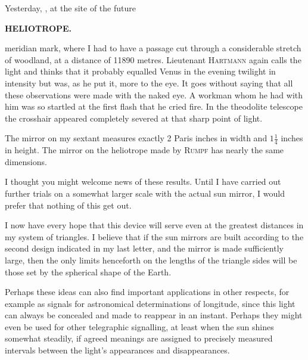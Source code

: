\par\noindent\hspace*{\parindent}Yesterday, , at the site of the future 

\par\clearpage
\noindent\null\hfill{\small\textbf{HELIOTROPE.}}\hfill{}\par\medskip
\noindent{} meridian mark, where I had to have a passage cut through a considerable stretch of woodland, at a distance of 11890 metres. Lieutenant \textsc{Hartmann} again calls the light  and thinks that it probably equalled Venus in the evening twilight in intensity but was, as he put it, more  to the eye. It goes without saying that all these observations were made with the naked eye. A workman whom he had with him was so startled at the first flash that he cried fire. In the theodolite telescope the crosshair appeared completely severed at that sharp point of light.

\par\noindent\hspace*{\parindent}The mirror on my sextant measures exactly 2 Paris inches in width and $1\frac14$ inches in height. The mirror on the heliotrope made by \textsc{Rumpf} has nearly the same dimensions.

\par\noindent\hspace*{\parindent}I thought you might welcome news of these results. Until I have carried out further trials on a somewhat larger scale with the actual sun mirror, I would prefer that nothing of this get out.

\par\noindent\hspace*{\parindent}I now have every hope that this device will serve even at the greatest distances in my system of triangles. I believe that if the sun mirrors are built according to the second design indicated in my last letter, and the mirror is made sufficiently large, then the only limits henceforth on the lengths of the triangle sides will be those set by the spherical shape of the Earth.

\par\noindent\hspace*{\parindent}Perhaps these ideas can also find important applications in other respects, for example as signals for astronomical determinations of longitude, since this light can always be concealed and made to reappear in an instant. Perhaps they might even be used for other telegraphic signalling, at least when the sun shines somewhat steadily, if agreed meanings are assigned to precisely measured intervals between the light's appearances and disappearances.

